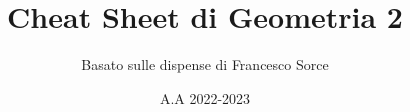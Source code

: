 \documentclass[10pt]{report}
\title{\Huge{Cheat Sheet di Geometria 2}}
\date{A.A 2022-2023}
\author{Basato sulle dispense di Francesco Sorce}
\begin{document}
\maketitle

\begin{multicols*}{2}
    \tableofcontents
\end{multicols*}

\newpage





\end{document}
